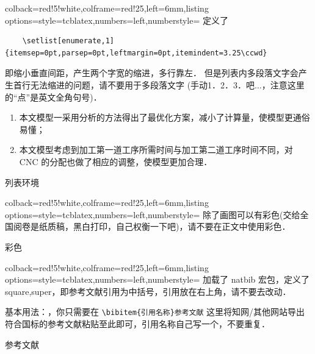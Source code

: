 \documentclass{JXUSTmodeling}
\begin{document}
\begin{example}[htbp]
    \centering
    \begin{tcblisting}{colback=red!5!white,colframe=red!25,left=6mm,listing options={style=tcblatex,numbers=left,numberstyle=\tiny\color{red!75!black}}}
定义了
\begin{verbatim}
    \setlist[enumerate,1]{itemsep=0pt,parsep=0pt,leftmargin=0pt,itemindent=3.25\ccwd}
\end{verbatim}
即缩小垂直间距，产生两个字宽的缩进，多行靠左． 但是列表内多段落文字会产生首行无法缩进的问题，请不要用于多段落文字 (手动1．2．3．吧$\ldots$，注意这里的“点”是英文全角句号)．
\begin{enumerate}
    \item 本文模型一采用分析的方法得出了最优化方案，减小了计算量，使模型更通俗易懂；
    \item 本文模型考虑到加工第一道工序所需时间与加工第二道工序时间不同，对 CNC 的分配也做了相应的调整，使模型更加合理．
\end{enumerate}
        \end{tcblisting}
        \caption{列表环境}\label{exam:8}
    \end{example}

\begin{example}[htbp]
    \centering
    \begin{tcblisting}{colback=red!5!white,colframe=red!25,left=6mm,listing options={style=tcblatex,numbers=left,numberstyle=\tiny\color{red!75!black}}}
    除了画图可以有彩色(交给全国阅卷是纸质稿，黑白打印，自己权衡一下吧)，请不要在正文中使用彩色．
\end{tcblisting}
    \caption{彩色}\label{exam:9}
\end{example}

\begin{example}[htbp]
    \centering
    \begin{tcblisting}{colback=red!5!white,colframe=red!25,left=6mm,listing options={style=tcblatex,numbers=left,numberstyle=\tiny\color{red!75!black}}}
    加载了 natbib 宏包，定义了 square,super，即参考文献引用为中括号，引用放在右上角，请不要去改动．

    基本用法：\cite{引用名称}，你只需要在 \verb|\bibitem{引用名称}参考文献| 这里将知网/其他网站导出符合国标的参考文献粘贴至此即可，引用名称自己写一个，不要重复．
\end{tcblisting}
    \caption{参考文献}\label{exam:10}
\end{example}
\end{document}
